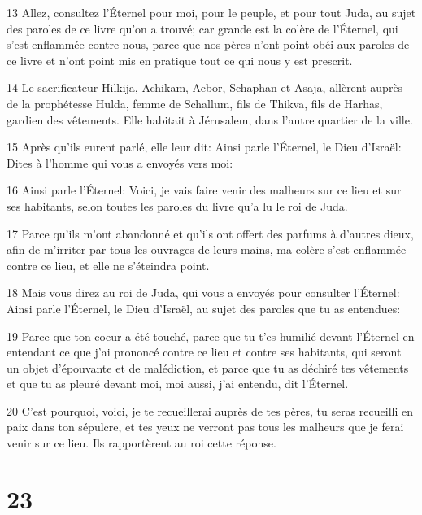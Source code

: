 \par 13 Allez, consultez l'Éternel pour moi, pour le peuple, et pour tout Juda, au sujet des paroles de ce livre qu'on a trouvé; car grande est la colère de l'Éternel, qui s'est enflammée contre nous, parce que nos pères n'ont point obéi aux paroles de ce livre et n'ont point mis en pratique tout ce qui nous y est prescrit.
\par 14 Le sacrificateur Hilkija, Achikam, Acbor, Schaphan et Asaja, allèrent auprès de la prophétesse Hulda, femme de Schallum, fils de Thikva, fils de Harhas, gardien des vêtements. Elle habitait à Jérusalem, dans l'autre quartier de la ville.
\par 15 Après qu'ils eurent parlé, elle leur dit: Ainsi parle l'Éternel, le Dieu d'Israël: Dites à l'homme qui vous a envoyés vers moi:
\par 16 Ainsi parle l'Éternel: Voici, je vais faire venir des malheurs sur ce lieu et sur ses habitants, selon toutes les paroles du livre qu'a lu le roi de Juda.
\par 17 Parce qu'ils m'ont abandonné et qu'ils ont offert des parfums à d'autres dieux, afin de m'irriter par tous les ouvrages de leurs mains, ma colère s'est enflammée contre ce lieu, et elle ne s'éteindra point.
\par 18 Mais vous direz au roi de Juda, qui vous a envoyés pour consulter l'Éternel: Ainsi parle l'Éternel, le Dieu d'Israël, au sujet des paroles que tu as entendues:
\par 19 Parce que ton coeur a été touché, parce que tu t'es humilié devant l'Éternel en entendant ce que j'ai prononcé contre ce lieu et contre ses habitants, qui seront un objet d'épouvante et de malédiction, et parce que tu as déchiré tes vêtements et que tu as pleuré devant moi, moi aussi, j'ai entendu, dit l'Éternel.
\par 20 C'est pourquoi, voici, je te recueillerai auprès de tes pères, tu seras recueilli en paix dans ton sépulcre, et tes yeux ne verront pas tous les malheurs que je ferai venir sur ce lieu. Ils rapportèrent au roi cette réponse.

\chapter{23}

